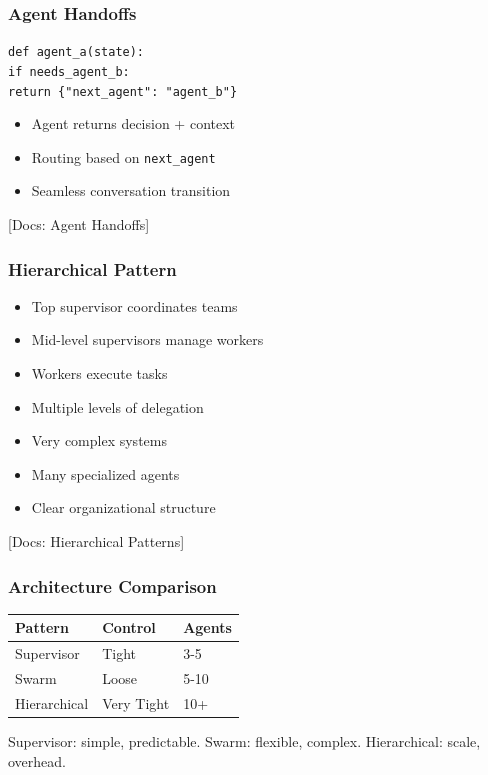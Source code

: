 \documentclass[aspectratio=169,11pt]{beamer}
\newcommand{\docref}[1]{{\scriptsize\color{docgray}[Docs: #1]}}
\begin{document}
\begin{frame}
\frametitle{Agent Handoffs}
\begin{tipbox}
\texttt{def agent\_a(state):}\\
\texttt{if needs\_agent\_b:}\\
\texttt{return \{"next\_agent": "agent\_b"\}}
\end{tipbox}
\vspace{0.1cm}
\begin{tipbox}[Implementation]
\setlength{\itemsep}{1pt}
\begin{itemize}
\item Agent returns decision + context
\item Routing based on \texttt{next\_agent}
\item Seamless conversation transition
\end{itemize}
\end{tipbox}
\docref{Agent Handoffs}
\end{frame}

\begin{frame}
\frametitle{Hierarchical Pattern}
\begin{conceptbox}[Structure]
\setlength{\itemsep}{1pt}
\begin{itemize}
\item Top supervisor coordinates teams
\item Mid-level supervisors manage workers
\item Workers execute tasks
\item Multiple levels of delegation
\end{itemize}
\end{conceptbox}
\vspace{0.1cm}
\begin{tipbox}
\setlength{\itemsep}{1pt}
\begin{itemize}
\item Very complex systems
\item Many specialized agents
\item Clear organizational structure
\end{itemize}
\end{tipbox}
\docref{Hierarchical Patterns}
\end{frame}

\begin{frame}
\frametitle{Architecture Comparison}
\begin{center}
\begin{tabular}{lll}
\toprule
\textbf{Pattern} & \textbf{Control} & \textbf{Agents} \\
\midrule
Supervisor & Tight & 3-5 \\
Swarm & Loose & 5-10 \\
Hierarchical & Very Tight & 10+ \\
\toprule
\end{tabular}
\end{center}
\vspace{0.1cm}
\begin{tipbox}
Supervisor: simple, predictable. Swarm: flexible, complex. Hierarchical: scale, overhead.
\end{tipbox}
\end{frame}
\end{document}
